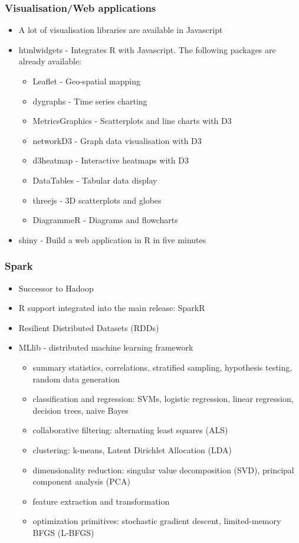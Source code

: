 \documentclass{beamer}
\begin{document}
\begin{frame}
\frametitle{Visualisation/Web applications}
\begin{itemize}
\item A lot of visualisation libraries are available in Javascript
\item htmlwidgets - Integrates R with Javascript. The following packages are already
			available:
			\begin{itemize}
			\item Leaflet - Geo-spatial mapping
			\item dygraphs - Time series charting
			\item MetricsGraphics - Scatterplots and line charts with D3
			\item networkD3 - Graph data visualisation with D3
			\item d3heatmap - Interactive heatmaps with D3
			\item DataTables - Tabular data display
			\item threejs - 3D scatterplots and globes
			\item DiagrammeR - Diagrams and flowcharts
			\end{itemize}
\item shiny - Build a web application in R in five minutes
\end{itemize}
\end{frame}

\begin{frame}
\frametitle{Spark}
\begin{itemize}
\item Successor to Hadoop
\item R support integrated into the main release: SparkR
\item Resilient Distributed Datasets (RDDs)
\item MLlib - distributed machine learning framework
	\begin{itemize}
  \item summary statistics, correlations, stratified sampling, hypothesis testing, random data generation
  \item classification and regression: SVMs, logistic regression, linear regression, decision trees, naive Bayes
  \item collaborative filtering: alternating least squares (ALS)
  \item clustering: k-means, Latent Dirichlet Allocation (LDA)
  \item dimensionality reduction: singular value decomposition (SVD), principal component analysis (PCA)
  \item feature extraction and transformation
  \item optimization primitives: stochastic gradient descent, limited-memory BFGS (L-BFGS)
  \end{itemize}
\end{itemize}
\end{frame}
\end{document}
